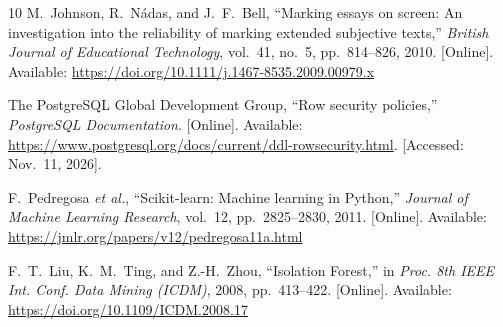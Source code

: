 \documentclass[conference]{IEEEtran}
\begin{document}
\begin{thebibliography}{10}
M.~Johnson, R.~N\'adas, and J.~F.~Bell, ``Marking essays on screen: An investigation into the reliability of marking extended subjective texts,'' \emph{British Journal of Educational Technology}, vol.~41, no.~5, pp.~814--826, 2010. [Online]. Available: \url{https://doi.org/10.1111/j.1467-8535.2009.00979.x}

The PostgreSQL Global Development Group, ``Row security policies,'' \emph{PostgreSQL Documentation}. [Online]. Available: \url{https://www.postgresql.org/docs/current/ddl-rowsecurity.html}. [Accessed: Nov.~11, 2026].

F.~Pedregosa \emph{et al.}, ``Scikit-learn: Machine learning in Python,'' \emph{Journal of Machine Learning Research}, vol.~12, pp.~2825--2830, 2011. [Online]. Available: \url{https://jmlr.org/papers/v12/pedregosa11a.html}

F.~T.~Liu, K.~M.~Ting, and Z.-H.~Zhou, ``Isolation Forest,'' in \emph{Proc. 8th IEEE Int. Conf. Data Mining (ICDM)}, 2008, pp.~413--422. [Online]. Available: \url{https://doi.org/10.1109/ICDM.2008.17}
\end{thebibliography}
\end{document}
